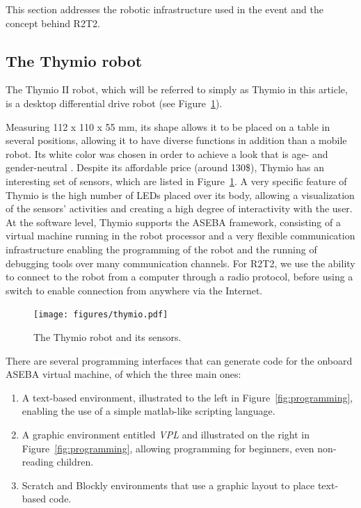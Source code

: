 \documentclass{intech-journal}
\begin{document}
This section addresses the robotic infrastructure used in the event and the concept behind R2T2.

\subsection{The Thymio robot}

The Thymio II robot, which will be referred to simply as Thymio in this article, is a desktop differential drive robot (see Figure~\ref{fig:thymio}).

Measuring 112 x 110 x 55 mm, its shape allows it to be placed on a table in several positions, allowing it to have diverse functions in addition than a mobile robot.
Its white color was chosen in order to achieve a look that is age- and gender-neutral \cite{riedo2013thymio}.
Despite its affordable price (around 130\$), Thymio has an interesting set of sensors, which are listed in Figure~\ref{fig:thymio}.
A very specific feature of Thymio is the high number of LEDs placed over its body, allowing a visualization of the sensors' activities and creating a high degree of interactivity with the user.
At the software level, Thymio supports the ASEBA framework\cite{magnenat2010aseba}, consisting of a virtual machine running in the robot processor and a very flexible communication infrastructure enabling the programming of the robot and the running of debugging tools over many communication channels. 
For R2T2, we use the ability to connect to the robot from a computer through a radio protocol, before using a switch to enable connection from anywhere via the Internet.

\begin{figure}[ht]
 \centering
    \texttt{[image: figures/thymio.pdf]}
  \caption{The Thymio robot and its sensors.}
  \label{fig:thymio} 
\end{figure}

There are several programming interfaces that can generate code for the onboard ASEBA virtual machine, of which the three main ones:
\begin{enumerate}
\item A text-based environment, illustrated to the left in Figure~\ref{fig:programming}, enabling the use of a simple matlab-like scripting language.
\item A graphic environment entitled \textit{VPL} and illustrated on the right in Figure~\ref{fig:programming}, allowing programming for beginners, even non-reading children.
\item Scratch and Blockly environments that use a graphic layout to place text-based code.
\end{enumerate}
\end{document}
